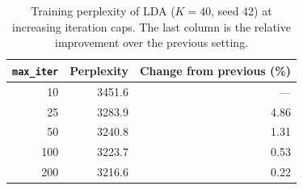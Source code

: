 \begin{table}[ht]
\centering
\caption{Training perplexity of LDA ($K=40$, seed 42) at increasing iteration caps. The last column is the relative improvement over the previous setting.}
\label{tab:max-iter}
\begin{tabular}{rrr}
\hline
\texttt{max\_iter} & Perplexity & Change from previous (\%) \\
\hline
10  & 3451.6 & --- \\
25  & 3283.9 & 4.86 \\
50  & 3240.8 & 1.31 \\
100 & 3223.7 & 0.53 \\
200 & 3216.6 & 0.22 \\
\hline
\end{tabular}
\end{table}
